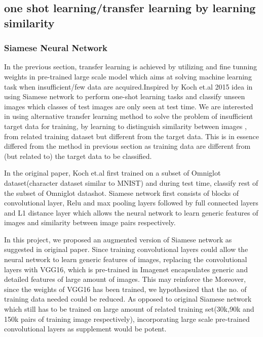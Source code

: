 \documentclass{article}
\begin{document}
\subsection{one shot learning/transfer learning by learning similarity}
\label{sec:oneshot}

\subsubsection{\textbf{Siamese Neural Network}}
In the previous section, transfer learning is achieved by utilizing and fine tunning weights in pre-trained large scale model which aims 
at solving machine learning task when insufficient/few data are acquired.Inspired by Koch et.al 2015 idea in using Siamese network to perform one-shot learning tasks and classify unseen images which classes of test images are only seen at test time. We are interested in using alternative transfer learning method to solve the problem of insufficient target data for training, by learning to distinguish similarity between images , from related training dataset but different from the target data. This is in essence differed from the method in previous section as training data are different from (but related to) the target data to be classified. 

In the original paper, Koch et.al first trained on a subset of Omniglot dataset(character dataset similar to MNIST) and during test time, classify rest of the subset of Omniglot datashot. Siamese network first consists of blocks of convolutional layer, Relu and max pooling layers followed by full connected layers and L1 distance layer which allows the neural network to learn generic features of images and similarity between image pairs respectively. 

In this project, we proposed an augmented version of Siamese network as suggested in original paper. Since training convolutional layers could allow the neural network to learn generic features of images, replacing the convolutional layers with VGG16, which is pre-trained in Imagenet encapsulates generic and detailed features of large amount of images. This may reinforce the Moreover, since the weights of VGG16 has been trained, we hypothesized that the no. of training data needed could be reduced. As opposed to original Siamese network which still has to be trained on large amount of related training set(30k,90k and 150k pairs of training image respectively), incorporating large scale pre-trained convolutional layers as supplement would be potent.
\end{document}
